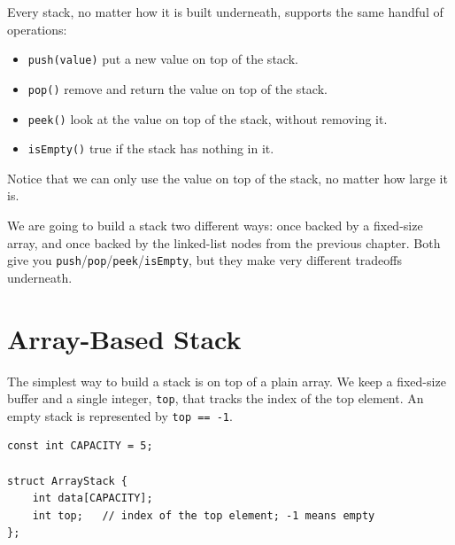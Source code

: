 Every stack, no matter how it is built underneath, supports the same handful of operations:

\begin{itemize}
    \item \texttt{push(value)} put a new value on top of the stack.
    \item \texttt{pop()} remove and return the value on top of the stack.
    \item \texttt{peek()} look at the value on top of the stack, without removing it.
    \item \texttt{isEmpty()} true if the stack has nothing in it.
\end{itemize}

Notice that we can only use the value on top of the stack, no matter how large it is.

We are going to build a stack two different ways: once backed by a fixed-size array, and once backed by the linked-list nodes from the previous chapter. Both give you \texttt{push}/\texttt{pop}/\texttt{peek}/\texttt{isEmpty}, but they make very different tradeoffs underneath.

\section{Array-Based Stack}

The simplest way to build a stack is on top of a plain array. We keep a fixed-size buffer and a single integer, \texttt{top}, that tracks the index of the top element. An empty stack is represented by \texttt{top == -1}.

\begin{verbatim}
const int CAPACITY = 5;

struct ArrayStack {
    int data[CAPACITY];
    int top;   // index of the top element; -1 means empty
};
\end{verbatim}

\begin{center}
\end{center}

